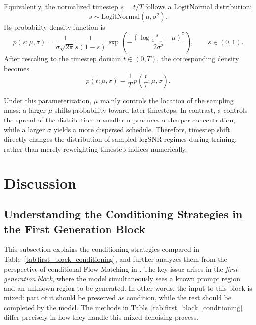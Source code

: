 Equivalently, the normalized timestep \(s=t/T\) follows a LogitNormal distribution:
\begin{equation}
s \sim \mathrm{LogitNormal}(\mu,\sigma^2).
\end{equation}
Its probability density function is
\begin{equation}
p(s;\mu,\sigma)
=
\frac{1}{\sigma \sqrt{2\pi}}
\frac{1}{s(1-s)}
\exp\!\left(
-\frac{(\log \frac{s}{1-s}-\mu)^2}{2\sigma^2}
\right),
\qquad s\in(0,1).
\label{eq:logitnormal_pdf}
\end{equation}
After rescaling to the timestep domain \(t\in(0,T)\), the corresponding density becomes
\begin{equation}
p(t;\mu,\sigma)
=
\frac{1}{T}\,
p\!\left(\frac{t}{T};\mu,\sigma\right).
\label{eq:timestep_shift_pdf}
\end{equation}

Under this parameterization, \(\mu\) mainly controls the location of the sampling mass: a larger \(\mu\) shifts probability toward later timesteps. In contrast, \(\sigma\) controls the spread of the distribution: a smaller \(\sigma\) produces a sharper concentration, while a larger \(\sigma\) yields a more dispersed schedule. Therefore, timestep shift directly changes the distribution of sampled logSNR regimes during training, rather than merely reweighting timestep indices numerically.

\section{Discussion}
\label{app:discussion}
\subsection{Understanding the Conditioning Strategies in the First Generation Block}
\label{app:first_block_conditioning_detail}

This subsection explains the conditioning strategies compared in Table~\ref{tab:first_block_conditioning}, and further analyzes them from the perspective of conditional Flow Matching in \method. The key issue arises in the \emph{first generation block}, where the model simultaneously sees a known prompt region and an unknown region to be generated. In other words, the input to this block is mixed: part of it should be preserved as condition, while the rest should be completed by the model. The methods in Table~\ref{tab:first_block_conditioning} differ precisely in how they handle this mixed denoising process.

